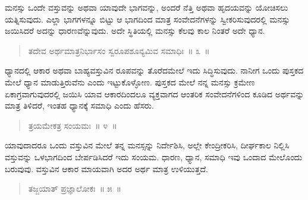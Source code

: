 \vspace{-0.4cm}


\vspace{0.2cm}

ಮನಸ್ಸು ಒಂದೇ ವಸ್ತುವನ್ನು ಅಥವಾ ಯಾವುದೇ ಭಾಗವನ್ನು, ಅಂದರೆ ನೆತ್ತಿ ಅಥವಾ ಹೃದಯವನ್ನು ಯೋಚಿಸಲು ಯತ್ನಿಸುವುದು. ಎಲ್ಲಾ ಭಾಗಗಳನ್ನೂ ಬಿಟ್ಟು ಆ ಭಾಗದಿಂದ ಮಾತ್ರ ಸಂವೇದನೆಗಳನ್ನು ಸ್ವೀಕರಿಸುವುದರಲ್ಲಿ ಮನಸ್ಸು ಜಯಿಸಿದರೆ ಅದನ್ನು ಧಾರಣವೆನ್ನುವುದು. ಅದೇ ಸ್ಥಿತಿಯಲ್ಲಿ ಮನಸ್ಸು ಕೆಲವು ಕಾಲ ನಿಂತರೆ ಅದೇ ಧ್ಯಾನ. 

\vspace{-0.2cm}

\begin{verse}
ತದೇವ ಅರ್ಥಮಾತ್ರನಿರ್ಭಾಸಂ ಸ್ವರೂಪಶೂನ್ಯಮಿವ ಸಮಾಧಿಃ~॥ ೩~॥
\end{verse}

\vspace{-0.4cm}


\vspace{0.2cm}

ಧ್ಯಾನದಲ್ಲಿ ಆಕಾರ ಅಥವಾ ಬಾಹ್ಯವಸ್ತುವಿನ ರೂಪವನ್ನು ತೊರೆದಮೇಲೆ ಇದು ಸಿದ್ಧಿಸುವುದು. ನಾನೀಗ ಒಂದು ಪುಸ್ತಕದ ಮೇಲೆ ಧ್ಯಾನ ಮಾಡುತ್ತಿರುವೆನು ಎಂದು ಇಟ್ಟುಕೊಳ್ಳೋಣ. ಪುಸ್ತಕದ ಮೇಲೆ ನನ್ನ ಮನಸ್ಸು ಕ್ರಮೇಣ ಏಕಾಗ್ರವಾಗುವುದರಲ್ಲಿ ಜಯಿಸಿ ಯಾವ ಆಕಾರದಿಂದಲೂ ವ್ಯಕ್ತವಾಗದ ಆಂತರಿಕ ಸಂವೇದನೆಗಳಿಂದ ಕೂಡಿದ ಅರ್ಥವನ್ನು ಮಾತ್ರ ತಿಳಿದರೆ, ಇಂತಹ ಧ್ಯಾನಕ್ಕೆ ಸಮಾಧಿ ಎಂದು ಹೆಸರು. 

\vspace{-0.2cm}

\begin{verse}
ತ್ರಯಮೇಕತ್ರ ಸಂಯಮಃ~॥ ೪~॥
\end{verse}

\vspace{-0.4cm}


\vspace{0.2cm}

ಯಾವುದಾದರೂ ಒಂದು ವಸ್ತುವಿನ ಮೇಲೆ ತನ್ನ ಮನಸ್ಸನ್ನು ನಿರ್ದೇಶಿಸಿ, ಅಲ್ಲೇ ಕೇಂದ್ರೀಕರಿಸಿ, ದೀರ್ಘಕಾಲ ನಿಲ್ಲಿಸಿ ವಸ್ತುವನ್ನು ಒಳಭಾಗದಿಂದ ಬೇರ್ಪಡಿಸಿದರೆ ಇದು ಸಂಯಮ. ಧಾರಣ, ಧ್ಯಾನ, ಸಮಾಧಿ ಇವು ಒಂದಾದ ಮೇಲೊಂದು ಬರುವುವು. ವಸ್ತುವಿನ ಆಕಾರ ಮಾಯವಾಗಿ ಅದರ ಅರ್ಥ ಮಾತ್ರ ಉಳಿಯುತ್ತದೆ. 

\vspace{-0.2cm}

\begin{verse}
ತಜ್ಜಯಾತ್​ ಪ್ರಜ್ಞಾಲೋಕಃ~॥ ೫~॥
\end{verse}

